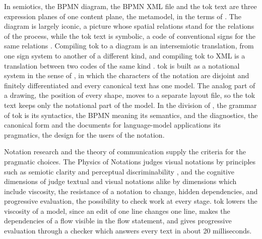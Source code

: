 \documentclass[11pt,a4paper]{article}
\begin{document}
In semiotics, the BPMN diagram, the BPMN XML file and the tok text are three expression planes of one content plane, the metamodel, in the terms of \citet{Hjelmslev1961}. The diagram is largely iconic, a picture whose spatial relations stand for the relations of the process, while the tok text is symbolic, a code of conventional signs for the same relations \citep{Peirce1931}. Compiling tok to a diagram is an intersemiotic translation, from one sign system to another of a different kind, and compiling tok to XML is a translation between two codes of the same kind \citep{Jakobson1959}. tok is built as a notational system in the sense of \citet{Goodman1976}, in which the characters of the notation are disjoint and finitely differentiated and every canonical text has one model. The analog part of a drawing, the position of every shape, moves to a separate layout file, so the tok text keeps only the notational part of the model. In the division of \citet{Morris1938}, the grammar of tok is its syntactics, the BPMN meaning its semantics, and the diagnostics, the canonical form and the documents for language-model applications its pragmatics, the design for the users of the notation.

Notation research and the theory of communication supply the criteria for the pragmatic choices. The Physics of Notations judges visual notations by principles such as semiotic clarity and perceptual discriminability \citep{Moody2009}, and the cognitive dimensions of \citet{GreenPetre1996} judge textual and visual notations alike by dimensions which include viscosity, the resistance of a notation to change, hidden dependencies, and progressive evaluation, the possibility to check work at every stage. tok lowers the viscosity of a model, since an edit of one line changes one line, makes the dependencies of a flow visible in the flow statement, and gives progressive evaluation through a checker which answers every text in about 20 milliseconds.
\end{document}
